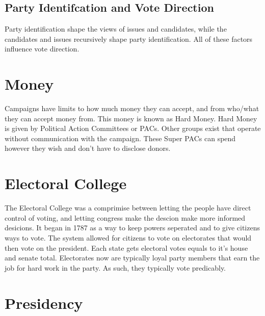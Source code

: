\documentclass{article}
\begin{document}
\subsection{Party Identifcation and Vote Direction}
\centering
{}
\raggedright

Party identification shape the views of issues and candidates, while the candidates and issues recursively shape party identification. All of these factors influence vote direction.

\section{Money}
Campaigns have limits to how much money they can accept, and from who/what they can accept money from. This money is known as Hard Money. Hard Money is given by Political Action Committees or PACs. Other groups exist that operate without communication with the campaign. These Super PACs can spend however they wish and don't have to disclose donors.

\section{Electoral College}
The Electoral College was a comprimise between letting the people have direct control of voting, and letting congress make the descion make more informed desicions. It began in 1787 as a way to keep powers seperated and to give citizens ways to vote. The system allowed for citizens to vote on electorates that would then vote on the president. Each state gets electoral votes equals to it's house and senate total. Electorates now are typically loyal party members that earn the job for hard work in the party. As such, they typically vote predicably.

\section{Presidency}
\end{document}
